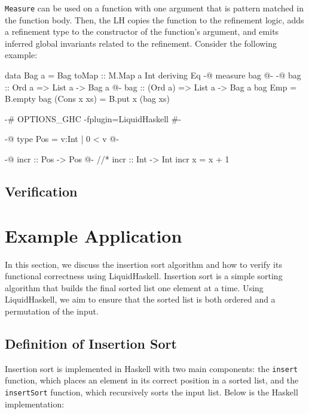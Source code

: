 \documentclass[]{rptuseminar}
\begin{document}
\texttt{Measure} can be used on a function with one argument that is pattern matched in the function body. Then, the
LH copies the function to the refinement logic, adds a refinement type to the constructor of the function's argument, and emits inferred global
invariants related to the refinement. Consider the following example:

\begin{haskell}
data Bag a = Bag { toMap :: M.Map a Int } deriving Eq
{-@ measure bag @-}
{-@ bag :: Ord a => List a -> Bag a @-}
bag :: (Ord a) => List a -> Bag a
bag Emp = B.empty
bag (Cons x xs) = B.put x (bag xs)
\end{haskell}

\begin{haskell}
 {-# OPTIONS_GHC -fplugin=LiquidHaskell #-}

 {-@ type Pos = {v:Int | 0 < v} @-}

 {-@ incr :: Pos -> Pos @-} //*\label{srcline:typerefinement}
 incr :: Int -> Int
 incr x = x + 1 
\end{haskell}

\subsection{Verification}


\section{Example Application}

In this section, we discuss the insertion sort algorithm and how to verify its functional correctness using LiquidHaskell. Insertion sort is a simple sorting algorithm that builds the final sorted list one element at a time. Using LiquidHaskell, we aim to ensure that the sorted list is both ordered and a permutation of the input.

\subsection{Definition of Insertion Sort}

Insertion sort is implemented in Haskell with two main components: the \texttt{insert} function, which places an element in its correct position in a sorted list, and the \texttt{insertSort} function, which recursively sorts the input list. Below is the Haskell implementation:
\end{document}

